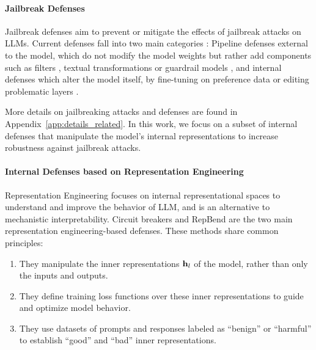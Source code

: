 \documentclass[11pt]{article}
\begin{document}
\paragraph{Jailbreak Defenses}

Jailbreak defenses aim to prevent or mitigate the effects of jailbreak attacks on LLMs.
Current defenses fall into two main categories : Pipeline defenses external to the model, which do not modify the model weights but rather add components such as filters \citep{jain2023baselinedefensesadversarialattacks}, textual transformations \citep{robey2024smoothllmdefendinglargelanguage, yuan2024rigorllmresilientguardrailslarge} or guardrail models \citep{zeng2024autodefensemultiagentllmdefense}, and internal defenses which alter the model itself, by fine-tuning on preference data \citep{kaufmann2024surveyreinforcementlearninghuman} or editing problematic layers \citep{zhao2024defendinglargelanguagemodels}.

More details on jailbreaking attacks and defenses are found in Appendix~\ref{app:details_related}.
In this work, we focus on a subset of internal defenses that manipulate the model's internal representations to increase robustness against jailbreak attacks.

\paragraph{Internal Defenses based on Representation Engineering}

Representation Engineering \citep{zou2025representationengineeringtopdownapproach} focuses on internal representational spaces to understand and improve the behavior of LLM,
and is an alternative to mechanistic interpretability. Circuit breakers \citep{zou2024improvingalignmentrobustnesscircuit} and RepBend \citep{yousefpour2025representationbendinglargelanguage} are the two main
representation engineering-based defenses.
These methods share common principles:

\begin{enumerate}
	\item They manipulate the inner representations $\textbf{h}_l$ of the model, rather than only the inputs and outputs.
    \item They define training loss functions over these inner representations to guide and optimize model behavior.
    \item They use datasets of prompts and responses labeled as ``benign'' or ``harmful'' to establish ``good'' and ``bad'' inner representations.
\end{enumerate}
\end{document}

